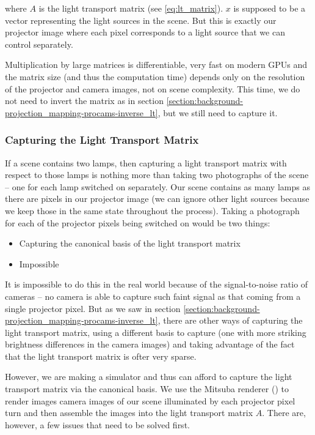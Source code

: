where \(A\) is the light transport matrix (see \ref{eq:lt_matrix}). \(x\) is supposed to be a vector representing the light sources in the scene. But this is exactly our projector image where each pixel corresponds to a light source that we can control separately.

Multiplication by large matrices is differentiable, very fast on modern GPUs and the matrix size (and thus the computation time) depends only on the resolution of the projector and camera images, not on scene complexity. This time, we do not need to invert the matrix as in section \ref{section:background-projection_mapping-procams-inverse_lt}, but we still need to capture it.

\subsubsection{Capturing the Light Transport Matrix}
\label{section:methods-rendering_function-complex-lt_capture}

If a scene contains two lamps, then capturing a light transport matrix with respect to those lamps is nothing more than taking two photographs of the scene -- one for each lamp switched on separately. Our scene contains as many lamps as there are pixels in our projector image (we can ignore other light sources because we keep those in the same state throughout the process). Taking a photograph for each of the projector pixels being switched on would be two things:

\begin{itemize}
    \item Capturing the canonical basis of the light transport matrix
    \item Impossible
\end{itemize}

It is impossible to do this in the real world because of the signal-to-noise ratio of cameras -- no camera is able to capture such faint signal as that coming from a single projector pixel. But as we saw in section \ref{section:background-projection_mapping-procams-inverse_lt}, there are other ways of capturing the light transport matrix, using a different basis to capture (one with more striking brightness differences in the camera images) and taking advantage of the fact that the light transport matrix is ofter very sparse.

However, we are making a simulator and thus can afford to capture the light transport matrix via the canonical basis. We use the Mitsuba renderer (\citet{Mitsuba}) to render images camera images of our scene illuminated by each projector pixel turn and then assemble the images into the light transport matrix \(A\). There are, however, a few issues that need to be solved first.

